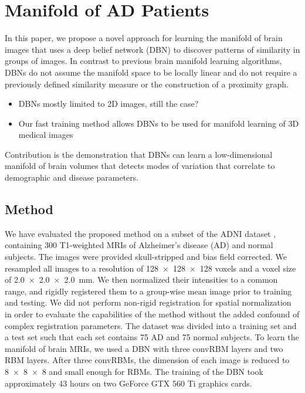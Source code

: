 \section{Manifold of AD Patients}


In this paper, we propose a novel approach for learning the manifold of brain
images that uses a deep belief network (DBN) \cite{Hinton2006b} to discover
patterns of similarity in groups of images. In contrast to previous
brain manifold learning algorithms, DBNs do not assume the manifold
space to be locally linear and do not require a previously defined similarity
measure or the construction of a proximity graph.
\begin{itemize}
\item DBNs mostly limited to 2D images, still the case?
\item Our fast training method allows DBNs to be used for manifold learning of
3D medical images
\end{itemize}

Contribution is the demonstration that DBNs can learn a low-dimensional manifold
of brain volumes that detects modes of variation that correlate to demographic
and disease parameters.

\subsection{Method}




We have evaluated the proposed method on a subset of the ADNI dataset
\cite{Petersen2010}, containing 300 T1-weighted MRIs of Alzheimer's disease (AD)
and normal subjects. The images were provided skull-stripped and bias field
corrected. We resampled all images to a resolution of \num{128x128x128} voxels
and a voxel size of \SI{2.0x2.0x2.0}{\milli\meter}. We then normalized their
intensities to a common range, and rigidly registered them to a group-wise mean
image prior to training and testing. We did not perform non-rigid registration
for spatial normalization in order to evaluate the capabilities of the method
without the added confound of complex registration parameters. The dataset was
divided into a training set and a test set such that each set contains 75 AD and
75 normal subjects. To learn the manifold of brain MRIs, we used a DBN with
three convRBM layers and two RBM layers. After three convRBMs, the dimension of
each image is reduced to \num{8x8x8} and small enough for RBMs. The training of
the DBN took approximately 43 hours on two GeForce GTX 560 Ti graphics cards.

